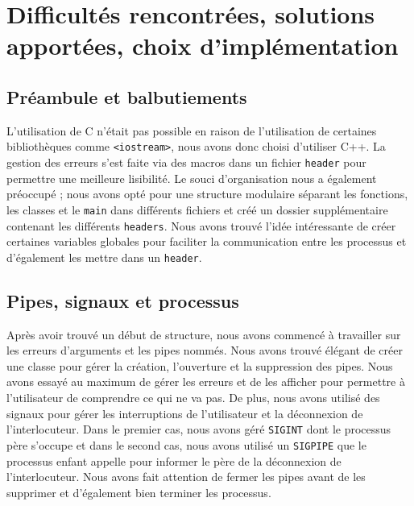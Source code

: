 \documentclass{article}
\begin{document}
\section{Difficultés rencontrées, solutions apportées, choix d'implémentation}
\label{difficultes-rencontrees-solutions-apportees-choix-dimplementation}

\subsection{Préambule et balbutiements}
\label{preambule-et-balbutiements}

L'utilisation de C n'était pas possible en raison de l'utilisation de certaines bibliothèques comme \texttt{<iostream>}, nous avons donc choisi d'utiliser C++.
La gestion des erreurs s'est faite via des macros dans un fichier \texttt{header} pour permettre une meilleure lisibilité.
Le souci d'organisation nous a également préoccupé ; nous avons opté pour une structure modulaire séparant les fonctions, 
les classes et le \texttt{main} dans différents fichiers et créé un dossier supplémentaire contenant les différents \texttt{headers}.
Nous avons trouvé l'idée intéressante de créer certaines variables globales pour faciliter la communication entre les processus et d'également les mettre dans un \texttt{header}.

\subsection{Pipes, signaux et processus}
\label{pipes-signaux-et-processus}


Après avoir trouvé un début de structure, nous avons commencé à travailler sur les erreurs d'arguments et les pipes nommés. 
Nous avons trouvé élégant de créer une classe pour gérer la création, l'ouverture et la suppression des pipes.
Nous avons essayé au maximum de gérer les erreurs et de les afficher pour permettre à l'utilisateur de comprendre ce qui ne va pas.
De plus, nous avons utilisé des signaux pour gérer les interruptions de l'utilisateur et la déconnexion de l'interlocuteur.
Dans le premier cas, nous avons géré \texttt{SIGINT} dont le processus père s'occupe et dans le second cas, nous avons utilisé un \texttt{SIGPIPE} 
que le processus enfant appelle pour informer le père de la déconnexion de l'interlocuteur. 
Nous avons fait attention de fermer les pipes avant de les supprimer et d'également bien terminer les processus.

\newpage
\end{document}
